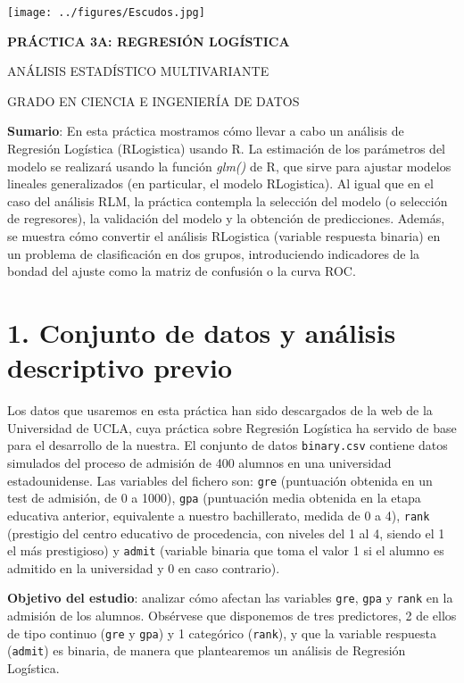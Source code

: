 \documentclass[
]{article}
\author{}
\date{\vspace{-2.5em}}
\begin{document}
\texttt{[image: ../figures/Escudos.jpg]}

\textbf{PRÁCTICA 3A: REGRESIÓN LOGÍSTICA}

ANÁLISIS ESTADÍSTICO MULTIVARIANTE

GRADO EN CIENCIA E INGENIERÍA DE DATOS

\textbf{Sumario}: En esta práctica mostramos cómo llevar a cabo un
análisis de Regresión Logística (RLogistica) usando R. La estimación de
los parámetros del modelo se realizará usando la función \emph{glm()} de
R, que sirve para ajustar modelos lineales generalizados (en particular,
el modelo RLogistica). Al igual que en el caso del análisis RLM, la
práctica contempla la selección del modelo (o selección de regresores),
la validación del modelo y la obtención de predicciones. Además, se
muestra cómo convertir el análisis RLogistica (variable respuesta
binaria) en un problema de clasificación en dos grupos, introduciendo
indicadores de la bondad del ajuste como la matriz de confusión o la
curva ROC.

\hypertarget{conjunto-de-datos-y-anuxe1lisis-descriptivo-previo}{%
\section{1. Conjunto de datos y análisis descriptivo
previo}\label{conjunto-de-datos-y-anuxe1lisis-descriptivo-previo}}

Los datos que usaremos en esta práctica han sido descargados de la web
de la Universidad de UCLA, cuya práctica sobre Regresión Logística ha
servido de base para el desarrollo de la nuestra. El conjunto de datos
\texttt{binary.csv} contiene datos simulados del proceso de admisión de
400 alumnos en una universidad estadounidense. Las variables del fichero
son: \texttt{gre} (puntuación obtenida en un test de admisión, de 0 a
1000), \texttt{gpa} (puntuación media obtenida en la etapa educativa
anterior, equivalente a nuestro bachillerato, medida de 0 a 4),
\texttt{rank} (prestigio del centro educativo de procedencia, con
niveles del 1 al 4, siendo el 1 el más prestigioso) y \texttt{admit}
(variable binaria que toma el valor 1 si el alumno es admitido en la
universidad y 0 en caso contrario).

\textbf{Objetivo del estudio}: analizar cómo afectan las variables
\texttt{gre}, \texttt{gpa} y \texttt{rank} en la admisión de los
alumnos. Obsérvese que disponemos de tres predictores, 2 de ellos de
tipo continuo (\texttt{gre} y \texttt{gpa}) y 1 categórico
(\texttt{rank}), y que la variable respuesta (\texttt{admit}) es
binaria, de manera que plantearemos un análisis de Regresión Logística.
\end{document}
